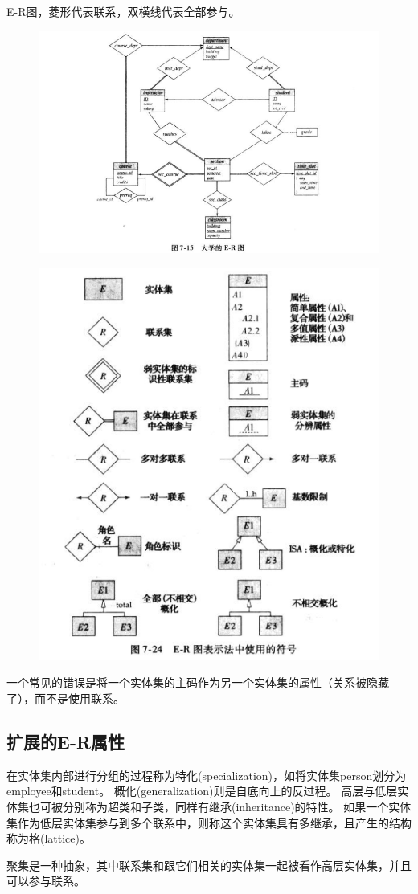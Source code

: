 E-R图，菱形代表联系，双横线代表全部参与。
\begin{figure}[H]
\centering
\includegraphics[width=0.8\linewidth]{fig/university_E-R.png}
\end{figure}
\begin{figure}[H]
\centering
\includegraphics[width=0.5\linewidth]{fig/E-R-figure.png}
\end{figure}

一个常见的错误是将一个实体集的主码作为另一个实体集的属性（关系被隐藏了），而不是使用联系。

\subsection{扩展的E-R属性}
\begin{definition}[特化和泛化]
在实体集内部进行分组的过程称为特化(specialization)，如将实体集person划分为employee和student。
概化(generalization)则是自底向上的反过程。
高层与低层实体集也可被分别称为超类和子类，同样有继承(inheritance)的特性。
如果一个实体集作为低层实体集参与到多个联系中，则称这个实体集具有多继承，且产生的结构称为格(lattice)。
\end{definition}

\begin{definition}[聚集]
聚集是一种抽象，其中联系集和跟它们相关的实体集一起被看作高层实体集，并且可以参与联系。
\end{definition}
